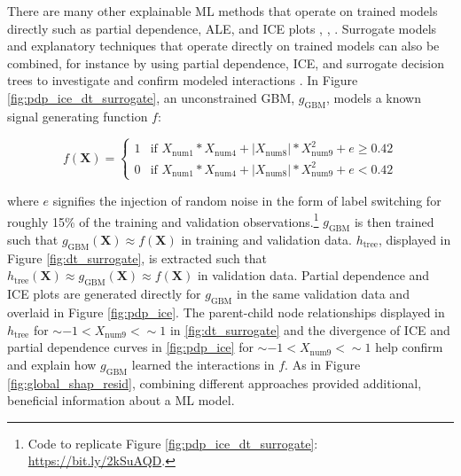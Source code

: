 \documentclass{article}
\newcommand{\twopartdef}[4]
{
	\left\{
		\begin{array}{ll}
			#1 & \mbox{if } #2 \\
			#3 & \mbox{if } #4
		\end{array}
	\right.
}
\begin{document}
There are many other explainable ML methods that operate on trained models directly such as partial dependence, ALE, and ICE plots \cite{ale_plot}, \cite{esl}, \cite{ice_plots}. Surrogate models and explanatory techniques that operate directly on trained models can also be combined, for instance by using partial dependence, ICE, and surrogate decision trees to investigate and confirm modeled interactions \cite{art_and_sci}. In Figure \ref{fig:pdp_ice_dt_surrogate}, an unconstrained GBM, $g_{\text{GBM}}$, models a known signal generating function $f$:

\begin{equation}
\label{eq:f}
f(\mathbf{X}) = \twopartdef {1} {X_{\text{num}1} * X_{\text{num}4} + |X_{\text{num}8}| * X_{\text{num}9}^2 + e \geq 0.42} {0} {X_{\text{num}1} * X_{\text{num}4} + |X_{\text{num}8}| * X_{\text{num}9}^2 + e < 0.42}
\end{equation}

\noindent where $e$ signifies the injection of random noise in the form of label switching for roughly 15\% of the training and validation observations.\footnote{\scriptsize{Code to replicate Figure \ref{fig:pdp_ice_dt_surrogate}: \url{https://bit.ly/2kSuAQD}.}} $g_{\text{GBM}}$ is then trained such that $g_{\text{GBM}}(\mathbf{X}) \approx f(\mathbf{X})$ in training and validation data. $h_{\text{tree}}$, displayed in Figure \ref{fig:dt_surrogate}, is extracted such that $h_{\text{tree}}(\mathbf{X}) \approx g_{\text{GBM}}(\mathbf{X}) \approx f(\mathbf{X})$ in validation data. Partial dependence and ICE plots are generated directly for $g_{\text{GBM}}$ in the same validation data and overlaid in Figure \ref{fig:pdp_ice}. The parent-child node relationships displayed in $h_{\text{tree}}$ for $\sim -1 < X_{\text{num9}} < \sim 1$ in \ref{fig:dt_surrogate} and the divergence of ICE and partial dependence curves in \ref{fig:pdp_ice} for $\sim -1 < X_{\text{num9}} < \sim 1$ help confirm and explain how $g_{\text{GBM}}$ learned the interactions in $f$. As in Figure \ref{fig:global_shap_resid}, combining different approaches provided additional, beneficial information about a ML model.
\end{document}
